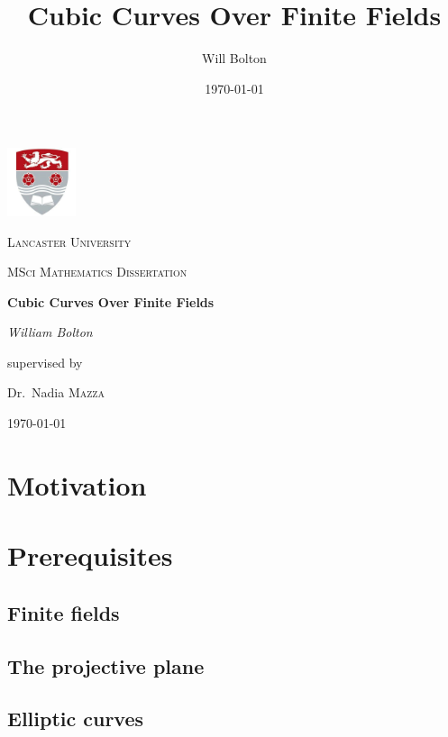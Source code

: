 \documentclass[a4paper,12pt,titlepage,oneside]{article}
\title{Cubic Curves Over Finite Fields}
\author{Will Bolton}
\date{\today}
\begin{document}
\begin{titlepage}
	\centering
	\includegraphics[width=0.15\textwidth]{../Figures/logo.jpg}\par\vspace{1cm}
	{\scshape\LARGE Lancaster University \par}
	\vspace{1cm}
	{\scshape\Large MSci Mathematics Dissertation\par}
	\vspace{1.5cm}
	{\huge\bfseries Cubic Curves Over Finite Fields\par}
	\vspace{2cm}
	{\Large\itshape William Bolton\par}
	\vfill
	supervised by\par
	Dr.~Nadia \textsc{Mazza}

	\vfill

	{\large \today\par}
\end{titlepage}
\tableofcontents
\clearpage

\section*{Motivation}

\clearpage

\section{Prerequisites}
\label{prerequisite-section}
\subsection{Finite fields}

\subsection{The projective plane}

\subsection{Elliptic curves}

\clearpage
\end{document}
